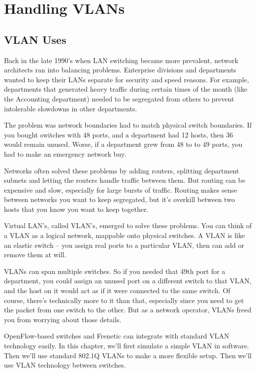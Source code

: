 
\chapter{Handling VLANs}

\section{VLAN Uses}
\label{handling_vlans:uses}

Back in the late 1990's when LAN switching became more prevalent, network architects ran into balancing problems.
Enterprise divisions and departments wanted to keep their 
LANs separate for security and speed reasons.  For example, departments that generated heavy traffic 
during certain times of the month (like the Accounting department) needed to be segregated from others
to prevent intolerable slowdowns in other departments.  

The problem was network boundaries had to match physical switch boundaries.  If you bought switches with
48 ports, and a department had 12 hosts, then 36 would remain unused.  Worse, if a department grew from 
48 to to 49 ports, you had to make an emergency network buy.  

Networks often solved these problems by adding routers, splitting department subnets and letting the 
routers handle traffic between them.  But routing can be expensive and slow, especially for large 
bursts of traffic.  Routing makes sense between networks you want to keep segregated, but it's
overkill between two hosts that you know you want to keep together.

Virtual LAN's, called VLAN's, emerged to solve these problems.  You can think of a VLAN as a logical 
network, mappable onto physical switches.  A VLAN is like an elastic switch -- you assign real ports to 
a particular VLAN, then can add or remove them at will.  

VLANs can span multiple switches.  So if you needed that 49th port for a department, you could assign 
an unused port on a different switch to that VLAN, and the host on it would act as if it were connected to 
the same switch.  Of course, there's technically more to it than that, especially since you need to get the
packet from one switch to the other.  But as a network operator, VLANs freed you from worrying about
those details.  

OpenFlow-based switches and Frenetic can integrate with standard VLAN technology easily.  In this 
chapter, we'll first simulate a simple VLAN in software.  Then we'll use standard 802.1Q VLANs to 
make a more flexible setup.  Then we'll use VLAN technology between switches.  

